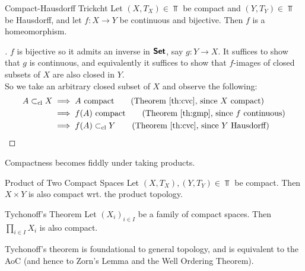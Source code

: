 \begin{corollary}{Compact-Hausdorff Trick}{cht}
    Let $(X,T_X)\in\Top$ be compact and $(Y,T_Y)\in\Top$ be Hausdorff, and let $f:X\to Y$ be continuous and bijective. Then $f$ is a homeomorphism.
\end{corollary}
\begin{proof}[]
    $f$ is bijective so it admits an inverse in $\bm{\mathsf{Set}}$, say $g:Y\to X$. It suffices to show that $g$ is continuous, and equivalently it suffices to show that $f$-images of closed subsets of $X$ are also closed in $Y$.\\

    So we take an arbitrary closed subset of $X$ and observe the following: \begin{align*}
        A\subset_{\text{cl}}X &\implies A  \text{ compact} \tag{Theorem \ref{th:cvc}, since $X$ compact}\\
        &\implies f(A) \text{ compact} \tag{Theorem \ref{th:gmp}, since $f$ continuous}\\
        &\implies f(A)\subset_{\text{cl}}Y \tag{Theorem \ref{th:cvc}, since $Y$ Hausdorff}
    \end{align*}
\end{proof}

Compactness becomes fiddly under taking products.

\begin{theorem}{Product of Two Compact Spaces}{}
    Let $(X,T_X),(Y,T_Y)\in\Top$ be compact. Then $X\times Y$ is also compact wrt. the product topology.
\end{theorem}

\begin{theorem}{Tychonoff's Theorem}{}
    Let $(X_i)_{i\in I}$ be a family of compact spaces. Then $\prod_{i\in I}X_i$ is also compact.
\end{theorem}

\begin{remark}{}{}
    Tychonoff's theorem is foundational to general topology, and is equivalent to the AoC (and hence to Zorn's Lemma and the Well Ordering Theorem).
\end{remark}

\newpage
